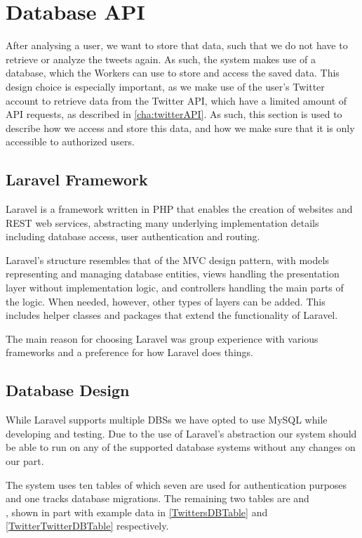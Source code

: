 \chapter{Database \acs{API}}\label{DatabaseAPI}
After analysing a user, we want to store that data, such that we do not have to
retrieve or analyze the tweets again. As such, the system makes use of a
database, which the Workers can use to store and access the saved data. This
design choice is especially important, as we make use of the user's Twitter
account to retrieve data from the Twitter \ac{API}, which have a limited amount
of API requests, as described in \autoref{cha:twitterAPI}. As such, this section
is used to describe how we access and store this data, and how we make sure that
it is only accessible to authorized users.

\section{Laravel Framework}\label{sec:laravel}
Laravel is a framework written in PHP that enables the creation of websites and
\ac{REST} web services, abstracting many underlying implementation details
including database access, user authentication and routing.\nl

Laravel's structure resembles that of the \ac{MVC} design pattern, with models
representing and managing database entities, views handling the presentation
layer without implementation logic, and controllers handling the main parts of
the logic. When needed, however, other types of layers can be added. This
includes helper classes and packages that extend the functionality of
Laravel.\nl

The main reason for choosing Laravel was group experience with various
frameworks and a preference for how Laravel does things.

\section{Database Design}\label{DBDesign}
While Laravel supports multiple \acp{DBS} \citep{LaravelDBS} we have opted to
use MySQL while developing and testing. Due to the use of Laravel's abstraction our
system should be able to run on any of the supported database systems without
any changes on our part.\nl

The system uses ten tables of which seven are used for authentication purposes
and one tracks database migrations. The remaining two tables are 
and \\, shown in part with example data in
\autoref{TwittersDBTable} and \autoref{TwitterTwitterDBTable} respectively.\nl

